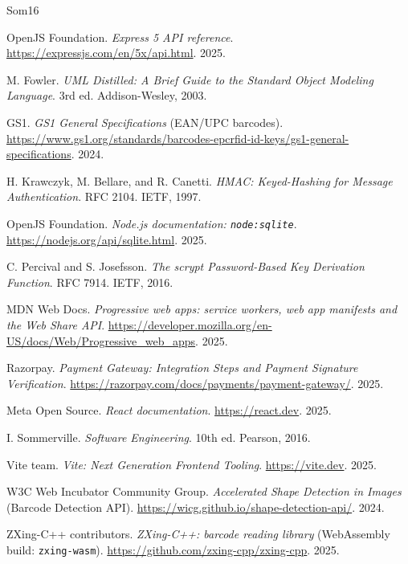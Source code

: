 \documentclass[12pt,letterpaper,twoside,openany]{report}
\begin{document}
\begin{thebibliography}{Som16}
\raggedright

 OpenJS Foundation. \emph{Express 5 API reference}.
  \url{https://expressjs.com/en/5x/api.html}. 2025.

 M. Fowler. \emph{UML Distilled: A Brief Guide to the Standard
  Object Modeling Language}. 3rd ed. Addison-Wesley, 2003.

 GS1. \emph{GS1 General Specifications} (EAN/UPC barcodes).
  \url{https://www.gs1.org/standards/barcodes-epcrfid-id-keys/gs1-general-specifications}. 2024.

 H. Krawczyk, M. Bellare, and R. Canetti. \emph{HMAC: Keyed-Hashing
  for Message Authentication}. RFC 2104. IETF, 1997.

 OpenJS Foundation. \emph{Node.js documentation:
  \texttt{node:sqlite}}. \url{https://nodejs.org/api/sqlite.html}. 2025.

 C. Percival and S. Josefsson. \emph{The scrypt Password-Based Key
  Derivation Function}. RFC 7914. IETF, 2016.

 MDN Web Docs. \emph{Progressive web apps: service workers, web app
  manifests and the Web Share API}. \url{https://developer.mozilla.org/en-US/docs/Web/Progressive_web_apps}. 2025.

 Razorpay. \emph{Payment Gateway: Integration Steps and Payment
  Signature Verification}. \url{https://razorpay.com/docs/payments/payment-gateway/}. 2025.

 Meta Open Source. \emph{React documentation}.
  \url{https://react.dev}. 2025.

 I. Sommerville. \emph{Software Engineering}. 10th ed.
  Pearson, 2016.

 Vite team. \emph{Vite: Next Generation Frontend Tooling}.
  \url{https://vite.dev}. 2025.

 W3C Web Incubator Community Group. \emph{Accelerated Shape
  Detection in Images} (Barcode Detection API).
  \url{https://wicg.github.io/shape-detection-api/}. 2024.

 ZXing-C++ contributors. \emph{ZXing-C++: barcode reading library}
  (WebAssembly build: \texttt{zxing-wasm}). \url{https://github.com/zxing-cpp/zxing-cpp}. 2025.

\end{thebibliography}
\end{document}
